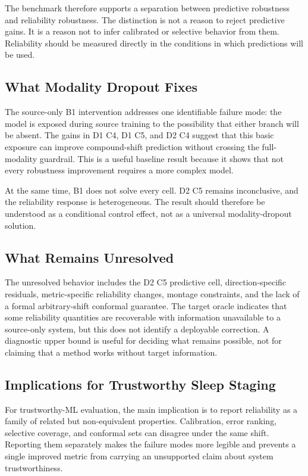 \documentclass[10pt,twocolumn]{article}
\begin{document}
The benchmark therefore supports a separation between predictive robustness and reliability robustness. The distinction is not a reason to reject predictive gains. It is a reason not to infer calibrated or selective behavior from them. Reliability should be measured directly in the conditions in which predictions will be used.

\subsection{What Modality Dropout Fixes}
The source-only B1 intervention addresses one identifiable failure mode: the model is exposed during source training to the possibility that either branch will be absent. The gains in D1 C4, D1 C5, and D2 C4 suggest that this basic exposure can improve compound-shift prediction without crossing the full-modality guardrail. This is a useful baseline result because it shows that not every robustness improvement requires a more complex model.

At the same time, B1 does not solve every cell. D2 C5 remains inconclusive, and the reliability response is heterogeneous. The result should therefore be understood as a conditional control effect, not as a universal modality-dropout solution.

\subsection{What Remains Unresolved}
The unresolved behavior includes the D2 C5 predictive cell, direction-specific residuals, metric-specific reliability changes, montage constraints, and the lack of a formal arbitrary-shift conformal guarantee. The target oracle indicates that some reliability quantities are recoverable with information unavailable to a source-only system, but this does not identify a deployable correction. A diagnostic upper bound is useful for deciding what remains possible, not for claiming that a method works without target information.

\subsection{Implications for Trustworthy Sleep Staging}
For trustworthy-ML evaluation, the main implication is to report reliability as a family of related but non-equivalent properties. Calibration, error ranking, selective coverage, and conformal sets can disagree under the same shift. Reporting them separately makes the failure modes more legible and prevents a single improved metric from carrying an unsupported claim about system trustworthiness.
\end{document}
